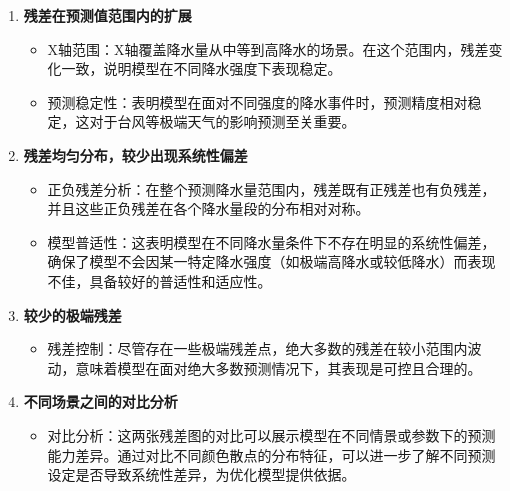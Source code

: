 \documentclass[withoutpreface,bwprint]{cumcmthesis}
\begin{document}
\begin{enumerate}
\begin{enumerate}
\begin{itemize}
                    \item 预测准确性：在零残差线附近存在大量点，尤其是在中间区域，说明模型能够对大部分降水量情况进行相对准确的预测，预测值与实际值之间的误差较小。
                \end{itemize}


            \item[(b)] \textbf{残差在预测值范围内的扩展}
                \begin{itemize}
                    \item X轴范围：X轴覆盖降水量从中等到高降水的场景。在这个范围内，残差变化一致，说明模型在不同降水强度下表现稳定。

                    \item 预测稳定性：表明模型在面对不同强度的降水事件时，预测精度相对稳定，这对于台风等极端天气的影响预测至关重要。
                    
                \end{itemize}

            \item[(c)] \textbf{残差均匀分布，较少出现系统性偏差}
                \begin{itemize}
                    \item 正负残差分析：在整个预测降水量范围内，残差既有正残差也有负残差，并且这些正负残差在各个降水量段的分布相对对称。

                    \item 模型普适性：这表明模型在不同降水量条件下不存在明显的系统性偏差，确保了模型不会因某一特定降水强度（如极端高降水或较低降水）而表现不佳，具备较好的普适性和适应性。
                    
                \end{itemize}

            \item[(d)] \textbf{较少的极端残差}
                \begin{itemize}
                
                    \item 残差控制：尽管存在一些极端残差点，绝大多数的残差在较小范围内波动，意味着模型在面对绝大多数预测情况下，其表现是可控且合理的。
                  
                \end{itemize}  
                
            \item[(e)] \textbf{不同场景之间的对比分析}
                \begin{itemize}
                    \item 对比分析：这两张残差图的对比可以展示模型在不同情景或参数下的预测能力差异。通过对比不同颜色散点的分布特征，可以进一步了解不同预测设定是否导致系统性差异，为优化模型提供依据。


\end{itemize}
\end{enumerate}
\end{enumerate}
\end{document}
